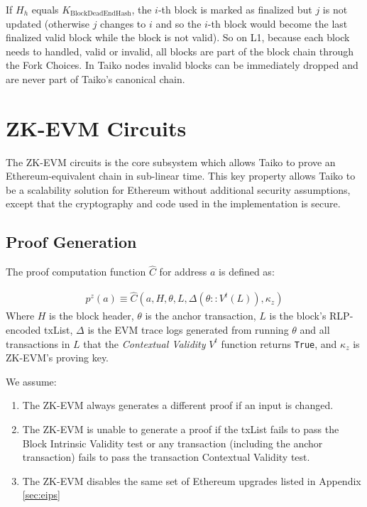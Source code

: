 \documentclass[9pt,oneside]{amsart}
\begin{document}
\begin{multicols}{2}
If $H_h$ equals $K_{\mathrm{BlockDeadEndHash}}$, the $i$-th block is marked as finalized but $j$ is not updated (otherwise $j$ changes to $i$ and so the $i$-th block would become the last finalized valid block while the block is not valid). So on L1, because each block needs to handled, valid or invalid, all blocks are part of the block chain through the Fork Choices. In Taiko nodes invalid blocks can be immediately dropped and are never part of Taiko's canonical chain.

\section{ZK-EVM Circuits}

The ZK-EVM circuits is the core subsystem which allows Taiko to prove an Ethereum-equivalent chain in sub-linear time. This key property allows Taiko to be a scalability solution for Ethereum without additional security assumptions, except that the cryptography and code used in the implementation is secure.

\subsection{Proof Generation} The proof computation function $\hat{C}$ for address $a$ is defined as:

\begin{eqnarray}
    p^z(a) \equiv \hat{C}(a, H,\theta, L, \Delta(\theta::V^t(L)),\kappa_z )
\end{eqnarray}
Where $H$ is the block header, $\theta$ is the anchor transaction, $L$ is the block's RLP-encoded txList, $\Delta$ is the EVM trace logs generated from running $\theta$ and all transactions in $L$ that the \textit{Contextual Validity} $V^t$ function returns \texttt{True}, and $\kappa_z$ is  ZK-EVM's proving key.

We assume:
\begin{enumerate}
\item The ZK-EVM always generates a different proof if an input is changed.
\item The ZK-EVM is unable to generate a proof if the txList fails to pass the Block Intrinsic Validity test or any transaction (including the anchor transaction) fails to pass the transaction Contextual Validity test.
\item The ZK-EVM disables the same set of Ethereum upgrades listed in Appendix \ref{sec:eips}
\end{enumerate}


\end{multicols}
\end{document}
